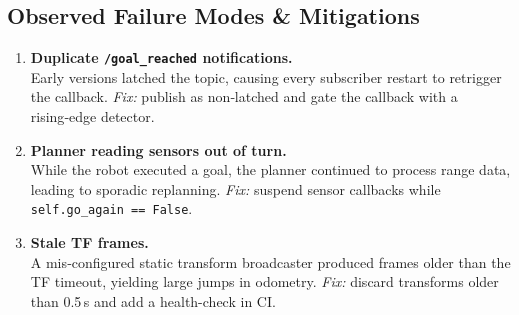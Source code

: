 \subsection{Observed Failure Modes \& Mitigations}
\begin{enumerate}
  \item \textbf{Duplicate \texttt{/goal\_reached} notifications.}\\
        Early versions latched the topic, causing every subscriber restart to retrigger the callback.  
        \emph{Fix:} publish as non‑latched and gate the callback with a rising‑edge detector.
  \item \textbf{Planner reading sensors out of turn.}\\
        While the robot executed a goal, the planner continued to process range data, leading to sporadic replanning.  
        \emph{Fix:} suspend sensor callbacks while \texttt{self.go\_again == False}.
  \item \textbf{Stale TF frames.}\\
        A mis‑configured static transform broadcaster produced frames older than the TF timeout, yielding large jumps in odometry.  
        \emph{Fix:} discard transforms older than 0.5\,s and add a health-check in CI.
\end{enumerate}